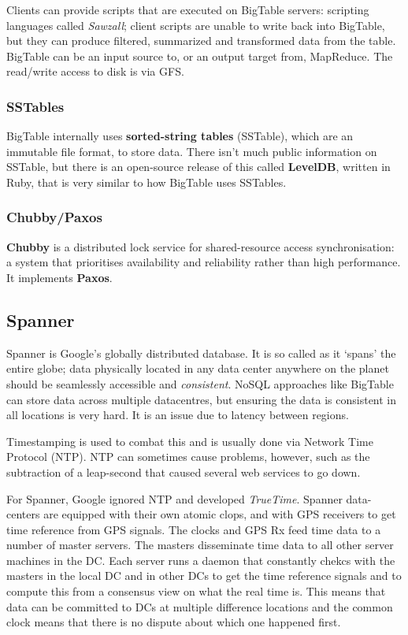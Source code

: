 \documentclass[11pt,a4paper,titlepage,dvipsnames,cmyk]{scrartcl}
\begin{document}
Clients can provide scripts that are executed on BigTable servers: scripting languages called \textit{Sawzall}; client scripts are unable to write back into BigTable, but they can produce filtered, summarized and transformed data from the table. BigTable can be an input source to, or an output target from, MapReduce. The read/write access to disk is via GFS.

\subsubsection{SSTables}
BigTable internally uses \textbf{sorted-string tables} (SSTable), which are an immutable file format, to store data. There isn't much public information on SSTable, but there is an open-source release of this called \textbf{LevelDB}, written in Ruby, that is very similar to how BigTable uses SSTables.

\subsubsection{Chubby/Paxos}
\textbf{Chubby} is a distributed lock service for shared-resource access synchronisation: a system that prioritises availability and reliability rather than high performance. It implements \textbf{Paxos}.

\subsection{Spanner}
Spanner is Google's globally distributed database. It is so called as it `spans' the entire globe; data physically located in any data center anywhere on the planet should be seamlessly accessible and \textit{consistent}. NoSQL approaches like BigTable can store data across multiple datacentres, but ensuring the data is consistent in all locations is very hard. It is an issue due to latency between regions.

Timestamping is used to combat this and is usually done via Network Time Protocol (NTP). NTP can sometimes cause problems, however, such as the subtraction of a leap-second that caused several web services to go down.

For Spanner, Google ignored NTP and developed \textit{TrueTime}. Spanner data-centers are equipped with their own atomic clops, and with GPS receivers to get time reference from GPS signals. The clocks and GPS Rx feed time data to a number of master servers. The masters disseminate time data to all other server machines in the DC. Each server runs a daemon that constantly chekcs with the masters in the local DC and in other DCs to get the time reference signals and to compute this from a consensus view on what the real time is. This means that data can be committed to DCs at multiple difference locations and the common clock means that there is no dispute about which one happened first.
\end{document}
